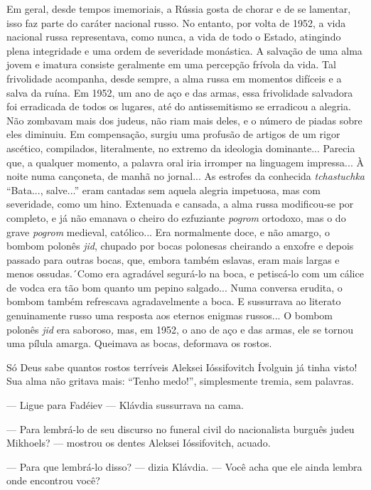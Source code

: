 Em geral, desde tempos imemoriais, a Rússia gosta de chorar e de se
lamentar, isso faz parte do caráter nacional russo. No entanto, por
volta de 1952, a vida nacional russa representava, como nunca, a vida de
todo o Estado, atingindo plena integridade e uma ordem de severidade
monástica. A salvação de uma alma jovem e imatura consiste geralmente em
uma percepção frívola da vida. Tal frivolidade acompanha, desde sempre,
a alma russa em momentos difíceis e a salva da ruína. Em 1952, um ano de
aço e das armas, essa frivolidade salvadora foi erradicada de todos os
lugares, até do antissemitismo se erradicou a alegria. Não zombavam mais
dos judeus, não riam mais deles, e o número de piadas sobre eles
diminuiu. Em compensação, surgiu uma profusão de artigos de um rigor
ascético, compilados, literalmente, no extremo da ideologia dominante...
Parecia que, a qualquer momento, a palavra oral iria irromper na
linguagem impressa... À noite numa cançoneta, de manhã no jornal... As
estrofes da conhecida \emph{tchastuchka} ``Bata..., salve...'' eram
cantadas sem aquela alegria impetuosa, mas com severidade, como um hino.
Extenuada e cansada, a alma russa modificou-se por completo, e já não
emanava o cheiro do ezfuziante \emph{pogrom} ortodoxo, mas o do grave
\emph{pogrom} medieval, católico... Era normalmente doce, e não amargo,
o bombom polonês \emph{jid}, chupado por bocas polonesas cheirando a
enxofre e depois passado para outras bocas, que, embora também eslavas,
eram mais largas e menos ossudas.´Como era agradável segurá-lo na boca,
e petiscá-lo com um cálice de vodca era tão bom quanto um pepino
salgado... Numa conversa erudita, o bombom também refrescava
agradavelmente a boca. E sussurrava ao literato genuinamente russo uma
resposta aos eternos enigmas russos... O bombom polonês \emph{jid} era
saboroso\emph{,} mas, em 1952, o ano de aço e das armas, ele se tornou
uma pílula amarga. Queimava as bocas, deformava os rostos.

Só Deus sabe quantos rostos terríveis Aleksei Ióssifovitch Ívolguin já
tinha visto! Sua alma não gritava mais: ``Tenho medo!'', simplesmente
tremia, sem palavras.

--- Ligue para Fadéiev --- Klávdia sussurrava na cama.

--- Para lembrá-lo de seu discurso no funeral civil do nacionalista
burguês judeu Mikhoels? --- mostrou os dentes Aleksei Ióssifovitch,
acuado.

--- Para que lembrá-lo disso? --- dizia Klávdia. --- Você acha que ele
ainda lembra onde encontrou você?

